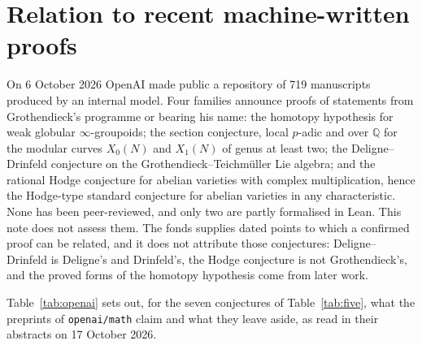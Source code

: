 \documentclass[11pt,a4paper]{article}
\begin{document}
\section{Relation to recent machine-written proofs}
On 6 October 2026 OpenAI made public a repository of 719 manuscripts
produced by an internal model. Four families announce proofs of statements
from Grothendieck's programme or bearing his name: the homotopy hypothesis
for weak globular $\infty$-groupoids; the section conjecture, local
$p$-adic and over $\mathbb Q$ for the modular curves $X_0(N)$ and $X_1(N)$ of
genus at least two; the Deligne--Drinfeld conjecture on the
Grothendieck--Teichmüller Lie algebra; and the rational Hodge conjecture for
abelian varieties with complex multiplication, hence the Hodge-type standard
conjecture for abelian varieties in any characteristic. None has been peer-reviewed, and only two are partly
formalised in Lean. This note does not assess them. The fonds supplies dated
points to which a confirmed proof can be related, and it does not attribute
those conjectures: Deligne--Drinfeld is Deligne's and Drinfeld's, the Hodge
conjecture is not Grothendieck's, and the proved forms of the homotopy
hypothesis come from later work.

Table~\ref{tab:openai} sets out, for the seven conjectures of
Table~\ref{tab:five}, what the preprints of \texttt{openai/math} claim and
what they leave aside, as read in their abstracts on 17 October 2026.
\end{document}

